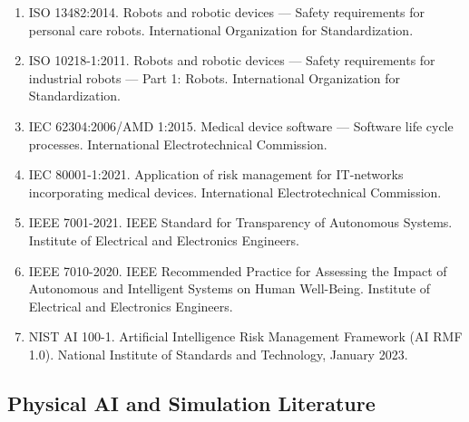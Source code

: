 \documentclass[11pt]{article}
\begin{document}
\begin{enumerate}[resume]
\item ISO 13482:2014. Robots and robotic devices --- Safety requirements for personal care robots. International Organization for Standardization.

\item ISO 10218-1:2011. Robots and robotic devices --- Safety requirements for industrial robots --- Part 1: Robots. International Organization for Standardization.

\item IEC 62304:2006/AMD 1:2015. Medical device software --- Software life cycle processes. International Electrotechnical Commission.

\item IEC 80001-1:2021. Application of risk management for IT-networks incorporating medical devices. International Electrotechnical Commission.

\item IEEE 7001-2021. IEEE Standard for Transparency of Autonomous Systems. Institute of Electrical and Electronics Engineers.

\item IEEE 7010-2020. IEEE Recommended Practice for Assessing the Impact of Autonomous and Intelligent Systems on Human Well-Being. Institute of Electrical and Electronics Engineers.

\item NIST AI 100-1. Artificial Intelligence Risk Management Framework (AI RMF 1.0). National Institute of Standards and Technology, January 2023.
\end{enumerate}

\subsection*{Physical AI and Simulation Literature}
\end{document}
